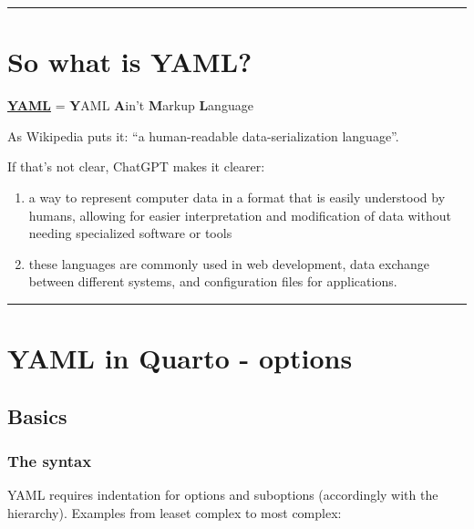 \documentclass[
  letterpaper,
  DIV=11,
  numbers=noendperiod]{scrartcl}
\begin{document}
\begin{center}\rule{0.5\linewidth}{0.5pt}\end{center}

\hypertarget{so-what-is-yaml}{%
\section{So what is YAML?}\label{so-what-is-yaml}}

\textbf{\href{https://yaml.org/}{YAML}} = \textbf{Y}AML \textbf{A}in't
\textbf{M}arkup \textbf{L}anguage

As Wikipedia puts it: ``a human-readable data-serialization language''.

If that's not clear, ChatGPT makes it clearer:

\begin{enumerate}
\def\labelenumi{\arabic{enumi})}
\item
  a way to represent computer data in a format that is easily understood
  by humans, allowing for easier interpretation and modification of data
  without needing specialized software or tools
\item
  these languages are commonly used in web development, data exchange
  between different systems, and configuration files for applications.
\end{enumerate}

\begin{center}\rule{0.5\linewidth}{0.5pt}\end{center}

\hypertarget{yaml-in-quarto---options}{%
\section{YAML in Quarto - options}\label{yaml-in-quarto---options}}

\hypertarget{basics}{%
\subsection{Basics}\label{basics}}

\hypertarget{the-syntax}{%
\subsubsection{The syntax}\label{the-syntax}}

YAML requires indentation for options and suboptions (accordingly with
the hierarchy). Examples from leaset complex to most complex:
\end{document}

